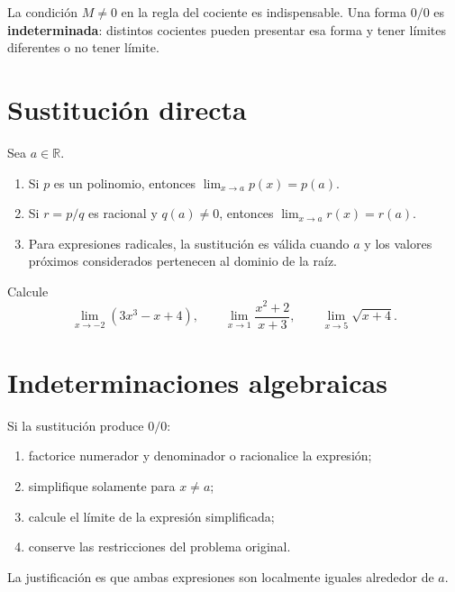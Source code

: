 \documentclass[10pt,a5paper]{article}
\newif\ifmostrarSoluciones
\begin{document}
\begin{nota}
La condición $M\neq0$ en la regla del cociente es indispensable. Una forma $0/0$ es \textbf{indeterminada}: distintos cocientes pueden presentar esa forma y tener límites diferentes o no tener límite.
\end{nota}

\section*{Sustitución directa}

\begin{proposicion}
Sea $a\in\mathbb{R}$.
\begin{enumerate}
  \item Si $p$ es un polinomio, entonces $\lim_{x\to a}p(x)=p(a)$.
  \item Si $r=p/q$ es racional y $q(a)\neq0$, entonces $\lim_{x\to a}r(x)=r(a)$.
  \item Para expresiones radicales, la sustitución es válida cuando $a$ y los valores próximos considerados pertenecen al dominio de la raíz.
\end{enumerate}
\end{proposicion}

\begin{ejemplo}
Calcule
\[
\lim_{x\to-2}(3x^3-x+4),\qquad
\lim_{x\to1}\frac{x^2+2}{x+3},\qquad
\lim_{x\to5}\sqrt{x+4}.
\]
\end{ejemplo}
\ifmostrarSoluciones
\begin{solucion}
Los denominadores y radicales son admisibles en los puntos indicados. Por sustitución,
\[
-18,\qquad \frac34,\qquad 3,
\]
respectivamente.
\end{solucion}
\else\vspace{15mm}\fi

\section*{Indeterminaciones algebraicas}

\begin{proposicion}
Si la sustitución produce $0/0$:
\begin{enumerate}
  \item factorice numerador y denominador o racionalice la expresión;
  \item simplifique solamente para $x\neq a$;
  \item calcule el límite de la expresión simplificada;
  \item conserve las restricciones del problema original.
\end{enumerate}
La justificación es que ambas expresiones son localmente iguales alrededor de $a$.
\end{proposicion}
\end{document}
